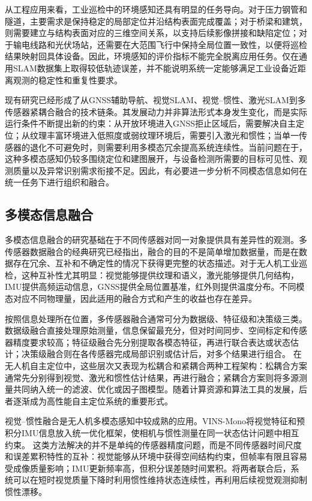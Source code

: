 从工程应用来看，工业巡检中的环境感知还具有明显的任务导向。对于压力钢管和隧道，主要需求是保持稳定的局部定位并沿结构表面完成覆盖；对于桥梁和建筑，则需要建立与结构表面对应的三维空间关系，以支持后续影像拼接和缺陷定位；对于输电线路和光伏场站，还需要在大范围飞行中保持全局位置一致性，以便将巡检结果映射回具体设备\cite{Ozaslan2017Penstocks,Zhang2022UBI,Ahmed2024Transmission,Yahya2022PVReview,bolourian2020lidarbridge,xu2023tunnelinspection}。因此，环境感知的评价指标不能完全脱离应用任务。仅在通用SLAM数据集上取得较低轨迹误差，并不能说明系统一定能够满足工业设备近距离观测的稳定性和重复性要求。

现有研究已经形成了从GNSS辅助导航、视觉SLAM、视觉--惯性、激光SLAM到多传感器紧耦合融合的技术链条。其发展动力并非算法形式本身发生变化，而是实际运行条件不断提出新的约束：从开放环境进入GNSS拒止区域后，需要解决自主定位；从纹理丰富环境进入低照度或弱纹理环境后，需要引入激光和惯性；当单一传感器的退化不可避免时，则需要利用多模态冗余提高系统连续性。当前问题在于，这种多模态感知仍较多围绕定位和建图展开，与设备检测所需要的目标可见性、观测质量以及异常识别需求衔接不足。因此，有必要进一步分析不同模态信息如何在统一任务下进行组织和融合。

\subsection{多模态信息融合}

多模态信息融合的研究基础在于不同传感器对同一对象提供具有差异性的观测。多传感器数据融合的经典研究已经指出，融合的目的不是简单增加数据量，而是在数据存在冗余、互补和不确定性的情况下获得更完整的状态描述\cite{Hall1997Fusion,Khaleghi2013Fusion}。对于无人机工业巡检，这种互补性尤其明显：视觉能够提供纹理和语义，激光能够提供几何结构，IMU提供高频运动信息，GNSS提供全局位置基准，红外则提供温度分布。不同模态对应不同物理量，因此适用的融合方式和产生的收益也存在差异。

按照信息处理所在位置，多传感器融合通常可分为数据级、特征级和决策级三类。数据级融合直接处理原始测量，信息保留最充分，但对时间同步、空间标定和传感器精度要求较高；特征级融合先分别提取各模态特征，再进行联合表达或状态估计；决策级融合则在各传感器完成局部识别或估计后，对多个结果进行组合\cite{Hall1997Fusion,Khaleghi2013Fusion}。 在无人机自主定位中，这些层次又表现为松耦合和紧耦合两种工程架构：松耦合方案通常先分别得到视觉、激光和惯性估计结果，再进行融合；紧耦合方案则将多源测量共同纳入统一的滤波、优化或因子图模型。随着计算资源和算法工具的发展，后者逐渐成为高性能自主定位系统的重要形式\cite{Fan2025FusionSLAM,Li2025UAVFusion}。

视觉--惯性融合是无人机多模态感知中较成熟的应用。VINS-Mono将视觉特征和预积分IMU信息放入统一优化框架，使相机与惯性测量在同一状态估计问题中相互约束\cite{Qin2018VINS}。 这类方法解决的并不是单纯的传感器精度问题，而是不同传感器时间尺度和误差累积特性的互补：视觉能够从环境中获得空间结构约束，但帧率有限且容易受成像质量影响；IMU更新频率高，但积分误差随时间累积。将两者联合后，系统可以在短时视觉质量下降时利用惯性维持状态连续性，再利用后续视觉观测抑制惯性漂移。

